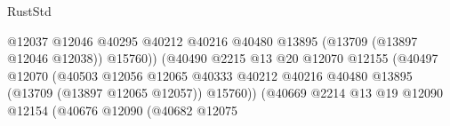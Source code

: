 \begin{lexlean}{RustStd}
\begin{coremodule}
                                                              @12037
                                                              @12046
                                                              @40295
                                                              @40212
                                                              @40216
                                                              @40480
                                                              @13895
                                                              (@13709 (@13897 @12046 @12038))
                                                              @15760))
                                                          (@40490
                                                            @2215
                                                            @13
                                                            @20
                                                            @12070
                                                            @12155
                                                            (@40497
                                                              @12070
                                                              (@40503
                                                                @12056
                                                                @12065
                                                                @40333
                                                                @40212
                                                                @40216
                                                                @40480
                                                                @13895
                                                                (@13709 (@13897 @12065 @12057))
                                                                @15760))
                                                            (@40669
                                                              @2214
                                                              @13
                                                              @19
                                                              @12090
                                                              @12154
                                                              (@40676
                                                                @12090
                                                                (@40682
                                                                  @12075

\end{coremodule}
\end{lexlean}
